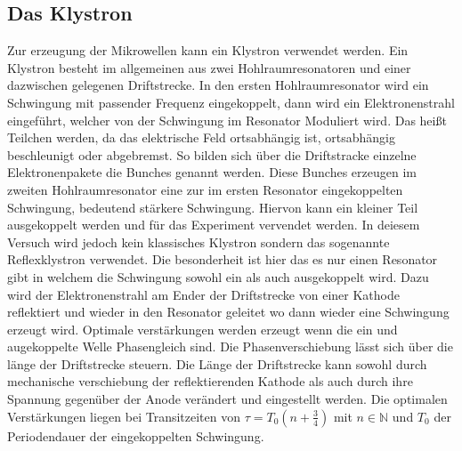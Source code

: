 \subsection{Das Klystron}
\label{sec:thklystron}
Zur erzeugung der Mikrowellen kann ein Klystron verwendet werden. Ein Klystron besteht im allgemeinen 
aus zwei Hohlraumresonatoren und einer dazwischen gelegenen Driftstrecke. In den ersten Hohlraumresonator 
wird ein Schwingung mit passender Frequenz eingekoppelt, dann wird ein Elektronenstrahl eingeführt, welcher 
von der Schwingung im Resonator Moduliert wird. Das heißt Teilchen werden, da das elektrische Feld ortsabhängig
ist, ortsabhängig beschleunigt oder abgebremst. So bilden sich über die Driftstracke 
einzelne Elektronenpakete die Bunches genannt werden. Diese Bunches erzeugen im zweiten Hohlraumresonator eine
zur im ersten Resonator eingekoppelten Schwingung, bedeutend stärkere Schwingung. Hiervon kann ein kleiner Teil 
ausgekoppelt werden und für das Experiment vervendet werden. In deiesem Versuch wird jedoch kein klassisches
Klystron sondern das sogenannte Reflexklystron verwendet. Die besonderheit ist hier das es nur einen Resonator 
gibt in welchem die Schwingung sowohl ein als auch ausgekoppelt wird. Dazu wird der Elektronenstrahl am Ender der 
Driftstrecke von einer Kathode reflektiert und wieder in den Resonator geleitet wo dann wieder eine Schwingung
erzeugt wird. Optimale verstärkungen werden erzeugt wenn die ein und augekoppelte Welle Phasengleich sind. 
Die Phasenverschiebung lässt sich über die länge der Driftstrecke steuern. Die Länge der Driftstrecke kann 
sowohl durch mechanische verschiebung der reflektierenden Kathode als auch durch ihre Spannung gegenüber 
der Anode verändert und eingestellt werden. Die optimalen Verstärkungen liegen bei Transitzeiten von
$\tau=T_0(n+\frac{3}{4})$ mit $n \in \mathbb{N}$ und $T_0$ der Periodendauer der eingekoppelten Schwingung.


